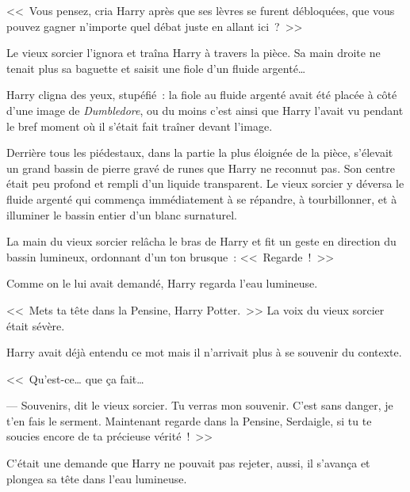 <<~Vous pensez, cria Harry après que ses lèvres se furent débloquées, que vous pouvez gagner n'importe quel débat juste en allant ici~?~>>

Le vieux sorcier l'ignora et traîna Harry à travers la pièce. Sa main droite ne tenait plus sa baguette et saisit une fiole d'un fluide argenté…

Harry cligna des yeux, stupéfié~: la fiole au fluide argenté avait été placée à côté d'une image de \emph{Dumbledore}, ou du moins c'est ainsi que Harry l'avait vu pendant le bref moment où il s'était fait traîner devant l'image.

Derrière tous les piédestaux, dans la partie la plus éloignée de la pièce, s'élevait un grand bassin de pierre gravé de runes que Harry ne reconnut pas. Son centre était peu profond et rempli d'un liquide transparent. Le vieux sorcier y déversa le fluide argenté qui commença immédiatement à se répandre, à tourbillonner, et à illuminer le bassin entier d'un blanc surnaturel.

La main du vieux sorcier relâcha le bras de Harry et fit un geste en direction du bassin lumineux, ordonnant d'un ton brusque~: <<~Regarde~!~>>

Comme on le lui avait demandé, Harry regarda l'eau lumineuse.

<<~Mets ta tête dans la Pensine, Harry Potter.~>> La voix du vieux sorcier était sévère.

Harry avait déjà entendu ce mot mais il n'arrivait plus à se souvenir du contexte.

<<~Qu'est-ce… que ça fait…

--- Souvenirs, dit le vieux sorcier. Tu verras mon souvenir. C'est sans danger, je t'en fais le serment. Maintenant regarde dans la Pensine, Serdaigle, si tu te soucies encore de ta précieuse vérité~!~>>

C'était une demande que Harry ne pouvait pas rejeter, aussi, il s'avança et plongea sa tête dans l'eau lumineuse.
\later

